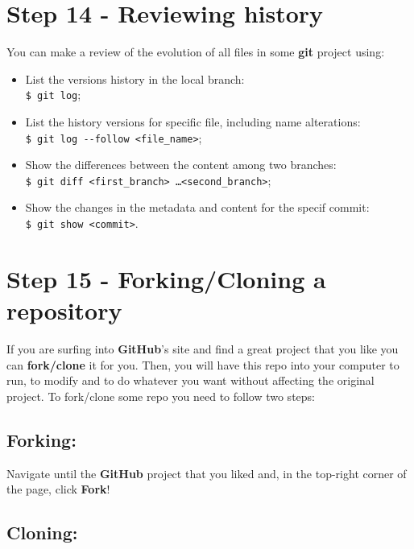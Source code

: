 \documentclass[12pt,a4paper,titlepage,brazil]{article}
\begin{document}
{%

\section{Step 14 - Reviewing history}

You can make a review of the evolution of all files in some {\bf git} project using:

\begin{itemize}
 \item List the versions history in the local branch:\\
   \texttt{\$ git log};
 \item List the history versions for specific file, including name alterations:\\
   \texttt{\$ git log -\hspace{0.01cm}-follow <file\_name>};
 \item Show the differences between the content among two branches:\\
   \texttt{\$ git diff <first\_branch> \dots <second\_branch>};
 \item Show the changes in the metadata and content for the specif commit:\\
   \texttt{\$ git show <commit>}.
\end{itemize}  



\section{Step 15 - Forking/Cloning a repository}

If you are surfing into {\bf GitHub}'s site and find a great project that you like you can {\bf fork/clone} it for you. Then, you will have this repo into your computer to run, to modify and to do whatever you want without affecting the original project. To fork/clone some repo you need to follow two steps:

\subsection{Forking:}

Navigate until the {\bf GitHub} project that you liked and, in the top-right corner of the page, click {\bf Fork}!

\subsection{Cloning:}

}
\end{document}
